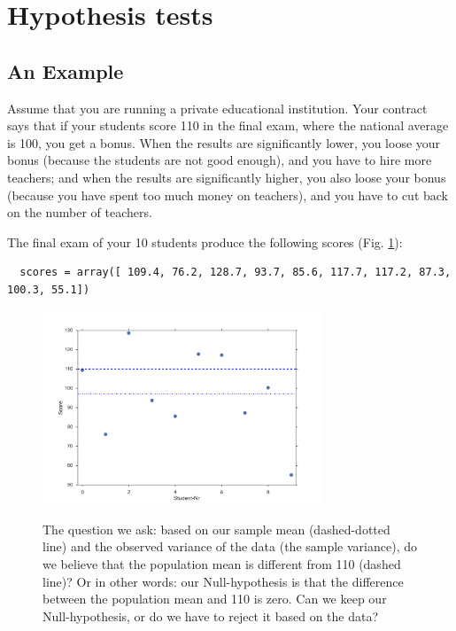 \section{Hypothesis tests}\label{sec:hypotheses} 

\subsection{An Example}

Assume that you are running a private educational institution. Your contract says that if your students score 110 in the final exam, where the national average is 100, you get a bonus. When the results are significantly lower, you loose your bonus (because the students are not good enough), and you have to hire more teachers; and when the results are significantly higher, you also loose your bonus (because you have spent too much money on teachers), and you have to cut back on the number of teachers.

The final exam of your 10 students produce the following scores (Fig. \ref{fig:ExampleTtest}):

\begin{lstlisting}
  scores = array([ 109.4, 76.2, 128.7, 93.7, 85.6, 117.7, 117.2, 87.3, 100.3, 55.1])
\end{lstlisting}

\begin{figure}[ht]
  \centering
  \includegraphics[width=0.75\textwidth]{../Images/fig_ExampleTtest.png}\\
  \caption{The question we ask: based on our sample mean (dashed-dotted line) and the observed variance of the data (the sample variance), do we believe that the population mean is different from 110 (dashed line)? Or in other words: our Null-hypothesis is that the difference between the population mean and 110 is zero. Can we keep our Null-hypothesis, or do we have to reject it based on the data?}\label{fig:ExampleTtest}
\end{figure}

